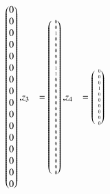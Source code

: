 \begin{beispiel}
{\begin{align*}
\begin{pmatrix*}[r]
 0\\
 0\\
 0\\
 0\\
 0\\
 0\\
 0\\
 0\\
 0\\
 0\\
 0\\
 0\\
 0\\
 0\\
 0\\
 0
\end{pmatrix*},
&z_3
&=
\tiny
\begin{pmatrix*}[r]
\phantom{-}
 0\\
 0\\
 1\\
 0\\
 0\\
 0\\
 0\\
 0\\
 1\\
 1\\
 0\\
 0\\
 0\\
 0\\
 0\\
 0\\
 0\\
 0\\
 0\\
 0\\
 0\\
 0\\
 0\\
 0\\
 0\\
 0\\
 0
\end{pmatrix*},
&z_4 %
&=
\tiny
\begin{pmatrix*}[r]
\phantom{-}
 0\\
 0\\
 0\\
 1\\
 0\\
 0\\
 0\\
 0\\
 0\\
 0\\

\end{pmatrix*}
\end{align*}}
\end{beispiel}
